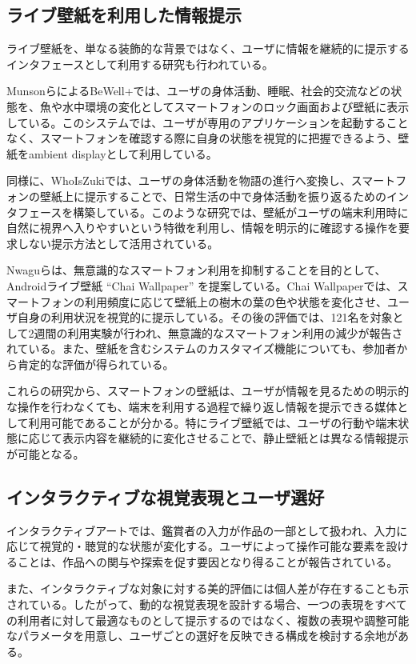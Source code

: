 \subsection{ライブ壁紙を利用した情報提示}

ライブ壁紙を、単なる装飾的な背景ではなく、ユーザに情報を継続的に提示するインタフェースとして利用する研究も行われている。

MunsonらによるBeWell+では、ユーザの身体活動、睡眠、社会的交流などの状態を、魚や水中環境の変化としてスマートフォンのロック画面および壁紙に表示している\cite{bewellplus}。このシステムでは、ユーザが専用のアプリケーションを起動することなく、スマートフォンを確認する際に自身の状態を視覚的に把握できるよう、壁紙をambient displayとして利用している。

同様に、WhoIsZukiでは、ユーザの身体活動を物語の進行へ変換し、スマートフォンの壁紙上に提示することで、日常生活の中で身体活動を振り返るためのインタフェースを構築している\cite{whoiszuki}。このような研究では、壁紙がユーザの端末利用時に自然に視界へ入りやすいという特徴を利用し、情報を明示的に確認する操作を要求しない提示方法として活用されている。

Nwaguらは、無意識的なスマートフォン利用を抑制することを目的として、Androidライブ壁紙 ``Chai Wallpaper'' を提案している\cite{nwagu2023chai}。Chai Wallpaperでは、スマートフォンの利用頻度に応じて壁紙上の樹木の葉の色や状態を変化させ、ユーザ自身の利用状況を視覚的に提示している。その後の評価では、121名を対象として2週間の利用実験が行われ、無意識的なスマートフォン利用の減少が報告されている。また、壁紙を含むシステムのカスタマイズ機能についても、参加者から肯定的な評価が得られている。

これらの研究から、スマートフォンの壁紙は、ユーザが情報を見るための明示的な操作を行わなくても、端末を利用する過程で繰り返し情報を提示できる媒体として利用可能であることが分かる。特にライブ壁紙では、ユーザの行動や端末状態に応じて表示内容を継続的に変化させることで、静止壁紙とは異なる情報提示が可能となる。


\subsection{インタラクティブな視覚表現とユーザ選好}

インタラクティブアートでは、鑑賞者の入力が作品の一部として扱われ、入力に応じて視覚的・聴覚的な状態が変化する。ユーザによって操作可能な要素を設けることは、作品への関与や探索を促す要因となり得ることが報告されている\cite{interactiveArtEngagement}。

また、インタラクティブな対象に対する美的評価には個人差が存在することも示されている。したがって、動的な視覚表現を設計する場合、一つの表現をすべての利用者に対して最適なものとして提示するのではなく、複数の表現や調整可能なパラメータを用意し、ユーザごとの選好を反映できる構成を検討する余地がある。

